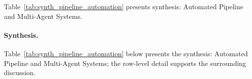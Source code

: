\noindent Table~\ref{tab:synth_pipeline_automation} presents synthesis: Automated Pipeline and Multi-Agent Systems.

\paragraph{Synthesis.}


\noindent Table~\ref{tab:synth_pipeline_automation} below presents the synthesis: Automated Pipeline and Multi-Agent Systems; the row-level detail supports the surrounding discussion.

